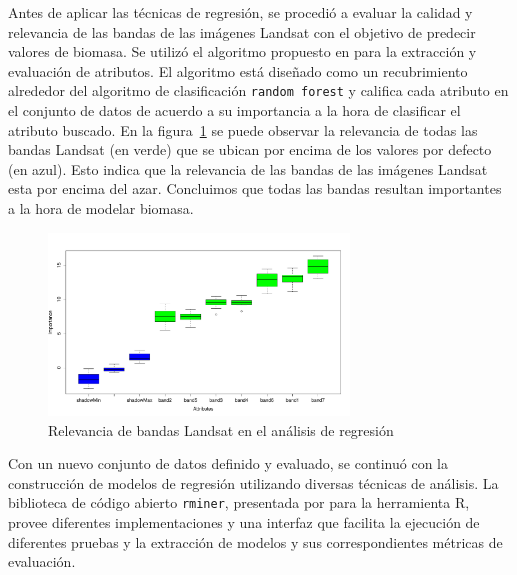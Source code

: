Antes de aplicar las técnicas de regresión, se procedió a evaluar la calidad y relevancia de las bandas de las imágenes Landsat con el objetivo de predecir valores de biomasa.  Se utilizó el algoritmo propuesto en \cite{kursa2010feature} para la extracción y evaluación de atributos. El algoritmo está diseñado como un recubrimiento alrededor del algoritmo de clasificación \texttt{random forest} y califica cada atributo en el conjunto de datos de acuerdo a su importancia a la hora de clasificar el atributo buscado. En la figura~\ref{fig:boruta} se puede observar la relevancia de todas las bandas Landsat (en verde) que se ubican por encima de los valores por defecto (en azul).  Esto indica que la relevancia de las bandas de las imágenes Landsat esta por encima del azar. Concluimos que todas las bandas resultan importantes a la hora de modelar biomasa.

\begin{figure}
  \centering
  \includegraphics[width = 8cm]{boruta.pdf}
  \caption{Relevancia de bandas Landsat en el análisis de regresión}
  \label{fig:boruta}
\end{figure}

Con un nuevo conjunto de datos definido y evaluado, se continuó con la construcción de modelos de regresión utilizando diversas técnicas de análisis.  La biblioteca de código abierto \texttt{rminer}, presentada por \cite{cortez2010data} para la herramienta R, provee diferentes implementaciones y una interfaz que facilita la ejecución de diferentes pruebas y la extracción de modelos y sus correspondientes métricas de evaluación.  


